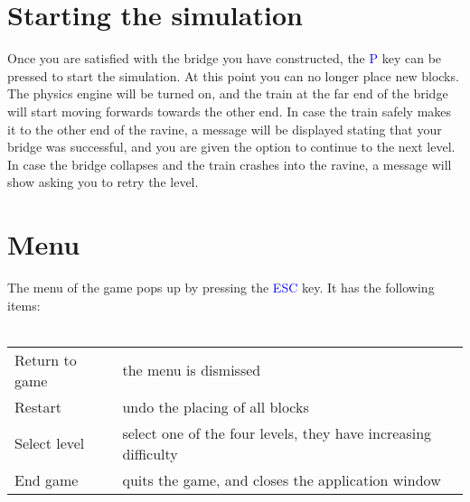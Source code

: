 \documentclass[a4paper,twoside,11pt]{article}
\numberwithin{equation}{section}
\newcommand{\key}[1]{\textcolor{blue}{#1}}
\begin{document}
\section{Starting the simulation}
Once you are satisfied with the bridge you have constructed, the \key{P} key can be pressed to start the simulation. At this point you can no longer place new blocks. The physics engine will be turned on, and the train at the far end of the bridge will start moving forwards towards the other end. In case the train safely makes it to the other end of the ravine, a message will be displayed stating that your bridge was successful, and you are given the option to continue to the next level. In case the bridge collapses and the train crashes into the ravine, a message will show asking you to retry the level.

\section{Menu}
The menu of the game pops up by pressing the \key{ESC} key. It has the following items:\\
\\
\begin{tabular}{ l l }
  Return to game & the menu is dismissed  \\
  Restart & undo the placing of all blocks \\
  Select level & select one of the four levels, they have increasing difficulty \\
  End game & quits the game, and closes the application window \\
\end{tabular}
\end{document}
